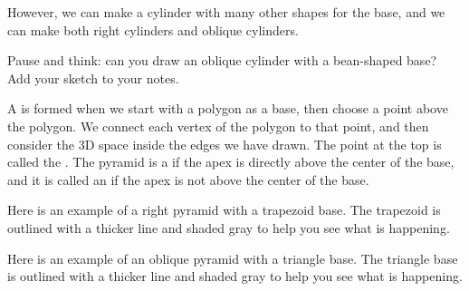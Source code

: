 \documentclass{ximera}
\begin{document}
However, we can make a cylinder with many other shapes for the base, and we can make both right cylinders and oblique cylinders.

\begin{question}
Pause and think: can you draw an oblique cylinder with a bean-shaped base? Add your sketch to your notes.
\end{question}


\begin{definition}
A  is formed when we start with a polygon as a base, then choose a point above the polygon. We connect each vertex of the polygon to that point, and then consider the 3D space inside the edges we have drawn. The point at the top is called the . The pyramid is a  if the apex is directly above the center of the base, and it is called an  if the apex is not above the center of the base.

Here is an example of a right pyramid with a trapezoid base. The trapezoid is outlined with a thicker line and shaded gray to help you see what is happening.
\begin{center}
\end{center}

Here is an example of an oblique pyramid with a triangle base. The triangle base is outlined with a thicker line and shaded gray to help you see what is happening.
\begin{center}
\end{center}

\end{definition}
\end{document}
